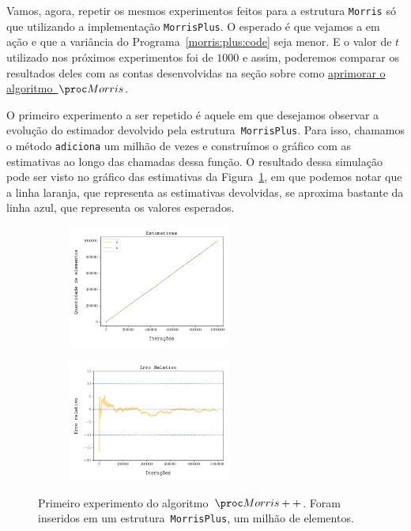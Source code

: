 Vamos, agora, repetir os mesmos experimentos feitos para a estrutura \texttt{Morris} só que utilizando a implementação 
\texttt{MorrisPlus}. O esperado é que vejamos a  em ação e que a variância do 
Programa~\ref{morris:plus:code} seja menor. E o valor de $t$ utilizado nos próximos experimentos foi de $1000$ e assim, 
poderemos comparar os resultados deles com as contas desenvolvidas na seção sobre como 
\hyperref[sec:morris:plus]{aprimorar o algoritmo~$\Morris$}.

O primeiro experimento a ser repetido é aquele em que desejamos observar a evolução do estimador devolvido pela 
estrutura~\texttt{MorrisPlus}. Para isso, chamamos o método \texttt{adiciona} um milhão de vezes e construímos o 
gráfico com as estimativas ao longo das chamadas dessa função. O resultado dessa simulação pode ser visto no gráfico 
das estimativas da Figura~\ref{fig:morris:plus:full}, em que podemos notar que a linha laranja, que representa as 
estimativas devolvidas, se aproxima bastante da linha azul, que representa os valores esperados.

\begin{figure}
  \centering
  \begin{subfigure}{.5\textwidth}
    \centering
    \includegraphics[height=4cm, width=\linewidth]{figuras/morris_plus_full.png}
  \end{subfigure}%
  \begin{subfigure}{.5\textwidth}
    \centering
    \captionsetup{justification=centering}
    \includegraphics[width=\linewidth, height=4cm]{figuras/morris_plus_erro_full.png}
  \end{subfigure}
  \caption{Primeiro experimento do algoritmo~$\Morrispp$. Foram inseridos em um estrutura~\texttt{MorrisPlus}, um milhão
  de elementos.}
  \label{fig:morris:plus:full}
\end{figure}

